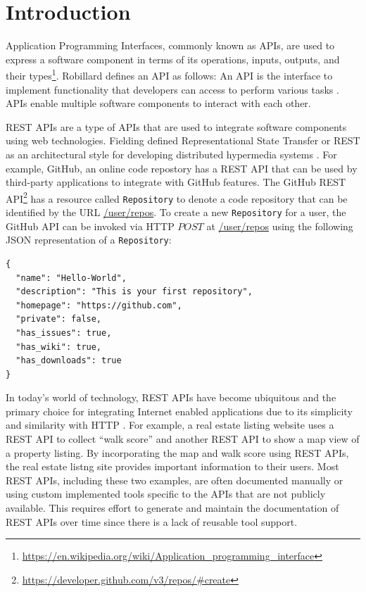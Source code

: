 \chapter{Introduction}
Application Programming Interfaces, commonly known as APIs, are used to express a software component in terms of its operations, inputs, outputs, and their types\footnote{\url{https://en.wikipedia.org/wiki/Application_programming_interface}}. Robillard defines an API as follows: An API is the interface to implement functionality that developers can access to perform various tasks \cite{Robillard_a_field_study, Robillard_what_makes}. APIs enable multiple software components to interact with each other.

REST APIs are a type of APIs that are used to integrate software components using web technologies. Fielding defined Representational State Transfer or REST as an architectural style for developing distributed hypermedia systems \cite{Fielding_rest}. For example, GitHub, an online code repostory has a REST API that can be used by third-party applications to integrate with GitHub features. The GitHub REST API\footnote{\url{https://developer.github.com/v3/repos/\#create}} has a resource called \texttt{Repository} to denote a code repository that can be identified by the URL \url{/user/repos}. To create a new \texttt{Repository} for a user, the GitHub API can be invoked via HTTP $POST$ at \url{/user/repos} using the following JSON representation of a \texttt{Repository}:

\begin{verbatim}
{
  "name": "Hello-World",
  "description": "This is your first repository",
  "homepage": "https://github.com",
  "private": false,
  "has_issues": true,
  "has_wiki": true,
  "has_downloads": true
}
\end{verbatim}

In today's world of technology, REST APIs have become ubiquitous and the primary choice for integrating Internet enabled applications due to its simplicity and similarity with HTTP \cite{mangler2010origin}. For example, a real estate listing website uses a REST API to collect ``walk score'' and another REST API to show a map view of a property listing. By incorporating the map and walk score using REST APIs, the real estate listng site provides important information to their users. Most REST APIs, including these two examples, are often documented manually or using custom implemented tools specific to the APIs that are not publicly available. This requires effort to generate and maintain the documentation of REST APIs over time since there is a lack of reusable tool support.

